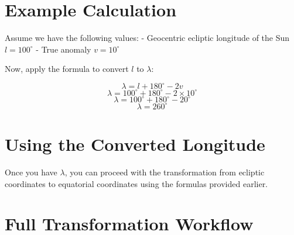 \documentclass[12pt,a4paper]{article}
\begin{document}
%	
%	
%	
	
	\section{Example Calculation} 
	
	Assume we have the following values:
	- Geocentric ecliptic longitude of the Sun \(l = 100^\circ\)
	- True anomaly \(v = 10^\circ\)
	
	Now, apply the formula to convert \(l\) to \(\lambda\):
	
	\[
	\lambda = l + 180^\circ - 2v
	\]
	\[
	\lambda = 100^\circ + 180^\circ - 2 \times 10^\circ
	\]
	\[
	\lambda = 100^\circ + 180^\circ - 20^\circ
	\]
	\[
	\lambda = 260^\circ
	\]
	
	\section{Using the Converted Longitude}
	
	Once you have \(\lambda\), you can proceed with the transformation from ecliptic coordinates to equatorial coordinates using the formulas provided earlier.
	
	\section{Full Transformation Workflow}
	
\end{document}

